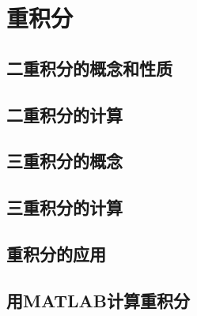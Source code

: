 \chapter{重积分}\label{cha:9}

\section{二重积分的概念和性质}

\section{二重积分的计算}

\section{三重积分的概念}

\section{三重积分的计算}

\section{重积分的应用}

\section{用MATLAB计算重积分}